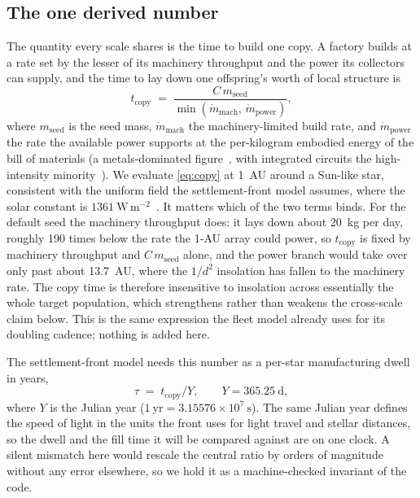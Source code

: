 \subsection{The one derived number}
The quantity every scale shares is the time to build one copy. A factory builds at a rate set
by the lesser of its machinery throughput and the power its collectors can supply, and the time
to lay down one offspring's worth of local structure is
\begin{equation}
t_\mathrm{copy} \;=\; \frac{C \, m_\mathrm{seed}}{\min\!\left(\dot{m}_\mathrm{mach},\,\dot{m}_\mathrm{power}\right)},
\label{eq:copy}
\end{equation}
where $m_\mathrm{seed}$ is the seed mass, $\dot{m}_\mathrm{mach}$ the machinery-limited build
rate, and $\dot{m}_\mathrm{power}$ the rate the available power supports at the per-kilogram
embodied energy of the bill of materials (a metals-dominated figure~\citep{ice-coefficients,gutowski-2009},
with integrated circuits the high-intensity minority~\citep{nagapurkar-das-2022}). We evaluate
\eqref{eq:copy} at 1~AU around a Sun-like star, consistent with the uniform field the
settlement-front model assumes, where the solar constant is
$1361\ \mathrm{W\,m^{-2}}$~\citep{kopp-lean-2011}. It matters which of the two terms binds. For
the default seed the machinery throughput does: it lays down about 20~kg per day, roughly 190
times below the rate the 1-AU array could power, so $t_\mathrm{copy}$ is fixed by machinery
throughput and $C\,m_\mathrm{seed}$ alone, and the power branch would take over only past about
13.7~AU, where the $1/d^{2}$ insolation has fallen to the machinery rate. The copy time is
therefore insensitive to insolation across essentially the whole target population, which
strengthens rather than weakens the cross-scale claim below. This is the same expression the
fleet model already uses for its doubling cadence; nothing is added here.

The settlement-front model needs this number as a per-star manufacturing dwell in years,
\begin{equation}
\tau \;=\; t_\mathrm{copy} / Y, \qquad Y = 365.25\ \mathrm{d},
\label{eq:dwell}
\end{equation}
where $Y$ is the Julian year ($1\ \mathrm{yr} = 3.15576\times10^{7}\ \mathrm{s}$). The
same Julian year defines the speed of light in the units the front uses for light travel
and stellar distances, so the dwell and the fill time it will be compared against are on
one clock. A silent mismatch here would rescale the central ratio by orders of magnitude
without any error elsewhere, so we hold it as a machine-checked invariant of the code.

